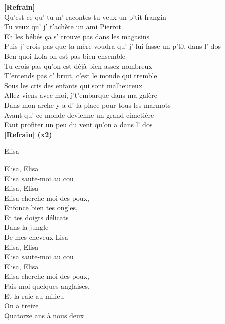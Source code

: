 \documentclass{novel}
\begin{document}
{\begin{minipage}[t][0.4\textheight][t]{\textwidth}
\begin{multicols}{2}
\textbf{[Refrain]} \\

Qu'est-ce qu' tu m' racontes tu veux un p'tit frangin \\
Tu veux qu' j' t'achète un ami Pierrot \\
Eh les bébés ça s' trouve pas dans les magasins \\
Puis j' crois pas que ta mère voudra qu' j' lui fasse un p'tit dans l' dos \\
Ben quoi Lola on est pas bien ensemble \\
Tu crois pas qu'on est déjà bien assez nombreux \\
T'entends pas c' bruit, c'est le monde qui tremble \\
Sous les cris des enfants qui sont malheureux \\
Allez viens avec moi, j't'embarque dans ma galère \\
Dans mon arche y a d' la place pour tous les marmots \\
Avant qu' ce monde devienne un grand cimetière \\
Faut profiter un peu du vent qu'on a dans l' dos \\

\textbf{[Refrain] (x2)}

\end{multicols}
\end{minipage}

\vspace{0.09\textheight}
\begin{minipage}[t][0.55\textheight][t]{\textwidth}
\h*{Elisa}
\begin{multicols}{2}
\footnotesize
Elisa, Elisa \\
Elisa saute-moi au cou \\
Elisa, Elisa \\
Elisa cherche-moi des poux, \\
Enfonce bien tes ongles, \\
Et tes doigts délicats \\
Dans la jungle \\
De mes cheveux Lisa \\

Elisa, Elisa \\
Elisa saute-moi au cou \\
Elisa, Elisa \\
Elisa cherche-moi des poux, \\
Fais-moi quelques anglaises, \\
Et la raie au milieu \\
On a treize \\
Quatorze ans à nous deux \\


\end{multicols}
\end{minipage}}
\end{document}
